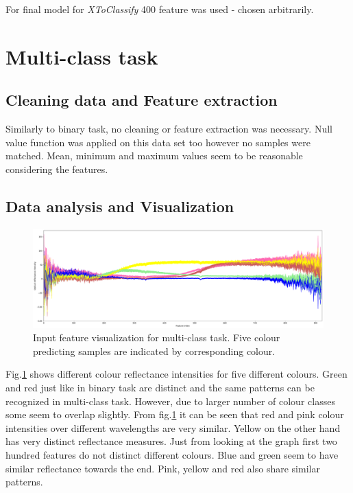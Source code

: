 \documentclass[11pt]{article}
\begin{document}
			For final model for \textit{XToClassify} 400 feature was used - chosen arbitrarily. 

			\clearpage
	\section{Multi-class task}
		\subsection{Cleaning data and Feature extraction}
			Similarly to binary task, no cleaning or feature extraction was necessary. Null value function was applied on this data set too however no samples were matched. Mean, minimum and maximum values seem to be reasonable considering the features. 

		\subsection{Data analysis and Visualization}

			\begin{figure}[H]
				\includegraphics[width=1\textwidth]{png/multi_default}
				\caption{Input feature visualization for multi-class task. Five colour predicting samples are indicated by corresponding colour.}
				\label{fig:multi}
			\end{figure}

			Fig.\ref{fig:multi} shows different colour reflectance intensities for five different colours. Green and red just like in binary task are distinct and the same patterns can be recognized in multi-class task. However, due to larger number of colour classes some seem to overlap slightly. From fig.\ref{fig:multi} it can be seen that red and pink colour intensities over different wavelengths are very similar. Yellow on the other hand has very distinct reflectance measures. Just from looking at the graph first two hundred features do not distinct different colours. Blue and green seem to have similar reflectance towards the end. Pink, yellow and red also share similar patterns. 
\end{document}
